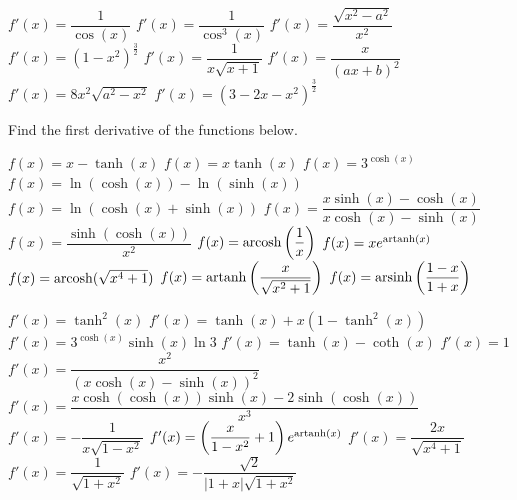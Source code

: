 \begin{Answer}\phantom{}
    \begin{multicols}{2}
	 
	\Question $f'(x)= \dfrac{1}{\cos(x)}$ 
	\Question $f'(x)= \dfrac{1}{\cos^3(x)}$ 
	\Question $f'(x)= \dfrac{\sqrt{x^2-a^2}}{x^2} $	
	\Question $f'(x)= \left( 1-x^2 \right)^{\frac{3}{2}} $
	\Question $f'(x)= \dfrac{1}{x\sqrt{x+1}}$	
	\Question $f'(x)= \dfrac{x}{(ax+b)^2} $
	\Question $f'(x)= 8 x^2 \sqrt{a^2 - x^2}$
	\Question $f'(x)= \left(3- 2x - x^2 \right)^{\frac{3}{2}}$
	\EndCurrentQuestion
	\end{multicols}
\end{Answer}
	
\ifanalysis
\begin{Exercise} Find the first derivative of the functions below.
	\begin{multicols}{2}
        \Question[difficulty = 1] $f(x)=x-\tanh (x)$
        \Question[difficulty = 1] $f(x)=x \tanh  (x)$ 
        \Question[difficulty = 1] $f(x)=3^{\cosh (x)}$
        \Question[difficulty = 1] $f(x)=\ln(\cosh (x))-\ln(\sinh (x))$
        \Question[difficulty = 1] $f(x)=\ln(\cosh (x) + \sinh (x))$ 
        \Question[difficulty = 1] $f(x)=\dfrac{x\sinh (x) - \cosh (x)}{x\cosh (x) - \sinh (x)}$
        \Question[difficulty = 1] $f(x)=\dfrac{\sinh(\cosh (x))}{x^2}$
        \Question[difficulty = 1] $f(x)=\operatorname{arcosh} \left(\dfrac{1}{x}\right)$
        \Question[difficulty = 1] $f(x)=x e^{\operatorname{artanh} (x)}$ 
        \Question[difficulty = 1] $f(x)=\operatorname{arcosh} (\sqrt{x^4+1})$
        \Question[difficulty = 2] $f(x)=\operatorname{artanh} \left(\dfrac{x}{\sqrt{x^2+1}}\right)$ 
        \Question[difficulty = 1] $f(x)=\operatorname{arsinh} \left(\dfrac{1-x}{1+x}\right)$
	    \EndCurrentQuestion
	\end{multicols}

\end{Exercise}

\begin{Answer}\phantom{}
    
	\Question $f'(x) = \tanh^2 (x)$
    \Question $f'(x) = \tanh (x) + x\left(1-\tanh^2 (x)\right)$
    \Question $f'(x) = 3^{\cosh (x)}\sinh(x) \ln 3 $
    \Question $f'(x) = \tanh(x) - \coth(x)$
    \Question $f'(x) = 1$
    \Question $f'(x) = \dfrac{x^2}{(x\cosh(x) - \sinh(x))^2}$
    \Question $f'(x) = \dfrac{x\cosh(\cosh(x))\sinh(x)- 2\sinh(\cosh(x))}{x^3}$
    \Question $f'(x) = -\dfrac{1}{x\sqrt{1-x^2}}$
    \Question $f'(x) = \left(\dfrac{x}{1-x^2}+1\right)e^{\operatorname{artanh} (x)}$
    \Question $f'(x) = \dfrac{2x}{\sqrt{x^4+1}}$
    \Question $f'(x) = \dfrac{1}{\sqrt{1+x^2}}$
    \Question $f'(x) = -\dfrac{\sqrt{2}}{|1+x|\sqrt{1+x^2}}$
	
\end{Answer}
	
